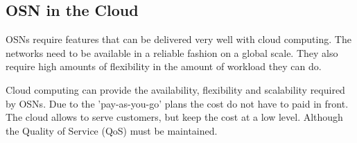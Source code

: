 \subsection{OSN in the Cloud} %
\label{sub:osn_in_the_cloud}
OSNs require features that can be delivered very well with cloud computing.
The networks need to be available in a reliable fashion
on a global scale.
They also require high amounts of flexibility in the amount of workload they can do.

Cloud computing can provide the availability, flexibility and scalability required by OSNs.
Due to the 'pay-as-you-go' plans the cost do not have to paid in front.
The cloud allows to serve customers,
but keep the cost at a low level.
Although the Quality of Service (QoS) must be maintained.
